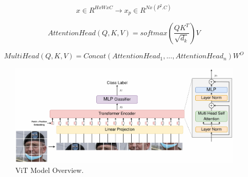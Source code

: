 \documentclass{article}
\begin{document}
\begin{equation}
	x \in R^{H x W x C} \rightarrow x_{p} \in R^{N x\left(P^{2} . C\right)}
	\label{lp_eq}
\end{equation}

\begin{equation}
	AttentionHead(Q, K, V)=softmax(\frac{QK^T}{\sqrt{d_k}})V
	\label{attn_eq}
\end{equation}

\begin{equation}
	MultiHead(Q, K, V) = Concat(AttentionHead_1, ..., AttentionHead_n)W^O
	\label{mha_eq}
\end{equation}

\begin{figure}[!b]
	\centering
	\includegraphics[scale=.35]{vit_archi.pdf}
	\caption{ViT Model Overview.}
	\label{ViT Fig.}
\end{figure}
\end{document}

